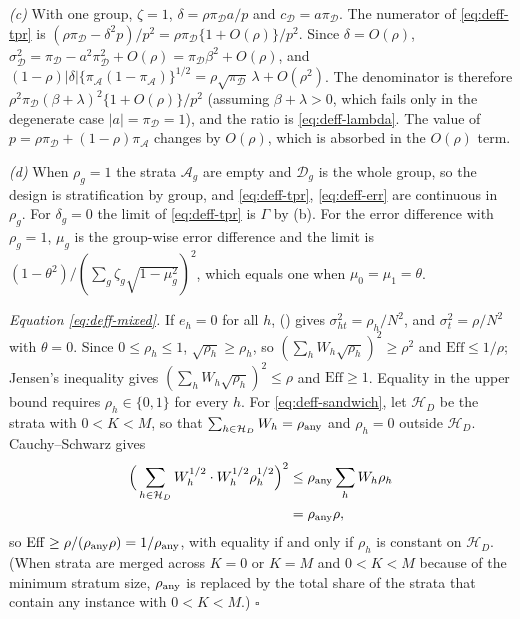 \emph{(c)} With one group, $\zeta=1$, $\delta=\rho\pi_{\mathcal D}a/p$ and
$c_{\mathcal D}=a\pi_{\mathcal D}$. The numerator of \eqref{eq:deff-tpr} is
$(\rho\pi_{\mathcal D}-\delta^2p)/p^2=\rho\pi_{\mathcal D}\{1+O(\rho)\}/p^2$. Since $\delta=O(\rho)$,
$\sigma^2_{\mathcal D}=\pi_{\mathcal D}-a^2\pi_{\mathcal D}^2+O(\rho)=\pi_{\mathcal D}\beta^2+O(\rho)$, and
$(1-\rho)|\delta|\{\pi_{\mathcal A}(1-\pi_{\mathcal A})\}^{1/2}=\rho\sqrt{\pi_{\mathcal D}}\,\lambda+O(\rho^2)$.
The denominator is therefore $\rho^2\pi_{\mathcal D}(\beta+\lambda)^2\{1+O(\rho)\}/p^2$ (assuming
$\beta+\lambda>0$, which fails only in the degenerate case $|a|=\pi_{\mathcal D}=1$), and the ratio is
\eqref{eq:deff-lambda}. The value of $p=\rho\pi_{\mathcal D}+(1-\rho)\pi_{\mathcal A}$ changes by
$O(\rho)$, which is absorbed in the $O(\rho)$ term.

\emph{(d)} When $\rho_g=1$ the strata $\mathcal A_g$ are empty and $\mathcal D_g$ is the whole group,
so the design is stratification by group, and \eqref{eq:deff-tpr}, \eqref{eq:deff-err} are continuous
in $\rho_g$. For $\delta_g=0$ the limit of \eqref{eq:deff-tpr} is $\Gamma$ by (b). For the error
difference with $\rho_g=1$, $\mu_g$ is the group-wise error difference and the limit is
$(1-\theta^2)/(\sum_g\zeta_g\sqrt{1-\mu_g^2})^2$, which equals one when $\mu_0=\mu_1=\theta$.

\emph{Equation \eqref{eq:deff-mixed}.} If $e_h=0$ for all $h$, () gives
$\sigma^2_{ht}=\rho_h/N^2$, and $\sigma^2_t=\rho/N^2$ with $\theta=0$. Since $0\le\rho_h\le1$,
$\sqrt{\rho_h}\ge\rho_h$, so $(\sum_hW_h\sqrt{\rho_h})^2\ge\rho^2$ and $\mathrm{Eff}\le1/\rho$; Jensen's
inequality gives $(\sum_hW_h\sqrt{\rho_h})^2\le\rho$ and $\mathrm{Eff}\ge1$. Equality in the upper bound
requires $\rho_h\in\{0,1\}$ for every $h$. For \eqref{eq:deff-sandwich}, let $\mathcal H_D$ be the
strata with $0<K<M$, so that $\sum_{h\in\mathcal H_D}W_h=\rho_{\rm any}$ and $\rho_h=0$ outside
$\mathcal H_D$. Cauchy--Schwarz gives
\begin{align*}
\Big(\sum_{h\in\mathcal H_D}W_h^{1/2}\cdot W_h^{1/2}\rho_h^{1/2}\Big)^2&\le\rho_{\rm any}\sum_hW_h\rho_h\\
&=\rho_{\rm any}\rho,
\end{align*}
so $\mathrm{Eff}\ge\rho/(\rho_{\rm any}\rho)=1/\rho_{\rm any}$, with equality if and only if $\rho_h$ is
constant on $\mathcal H_D$. (When strata are merged across $K=0$ or $K=M$ and $0<K<M$ because of the
minimum stratum size, $\rho_{\rm any}$ is replaced by the total share of the strata that contain
any instance with $0<K<M$.) $\square$

